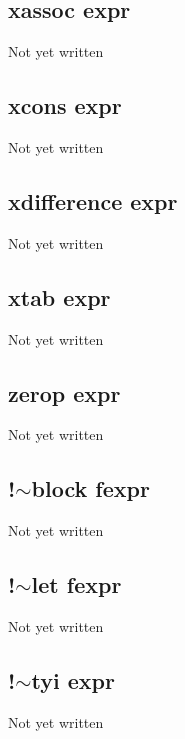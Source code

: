 \documentclass[a4paper,11pt]{article}
\begin{document}
\subsection{\ttfamily xassoc expr}
Not yet written

\subsection{\ttfamily xcons expr}
Not yet written

\subsection{\ttfamily xdifference expr}
Not yet written

\subsection{\ttfamily xtab expr}
Not yet written

\subsection{\ttfamily zerop expr}
Not yet written

\subsection{\ttfamily !$\sim$block fexpr}
Not yet written

\subsection{\ttfamily !$\sim$let fexpr}
Not yet written

\subsection{\ttfamily !$\sim$tyi expr}
Not yet written
\end{document}
